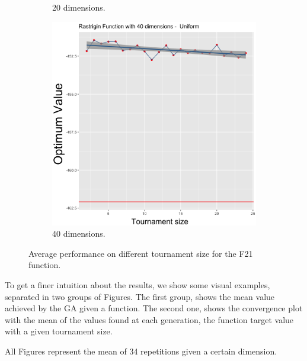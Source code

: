 \begin{figure}[t]
\begin{subfigure}[b]{0.33\textwidth}
		\caption{20 dimensions.}
	\end{subfigure}
	\begin{subfigure}[b]{0.33\textwidth}
		\centering
		\includegraphics[width=\textwidth]{img/multimodal_uniform_3_dim_40.png}
		\caption{40 dimensions.}
	\end{subfigure}
	\caption{Average performance on different tournament size for the F21 function.}
	\label{21}
\end{figure}


To get a finer intuition about the results, we show  some visual examples, separated in two groups of Figures. The first group, shows the mean value achieved by the GA given a function. The second one, shows the convergence plot with the mean of the values found at each generation, the function target value with a given tournament size.

All Figures represent the mean of 34 repetitions given a certain dimension.





